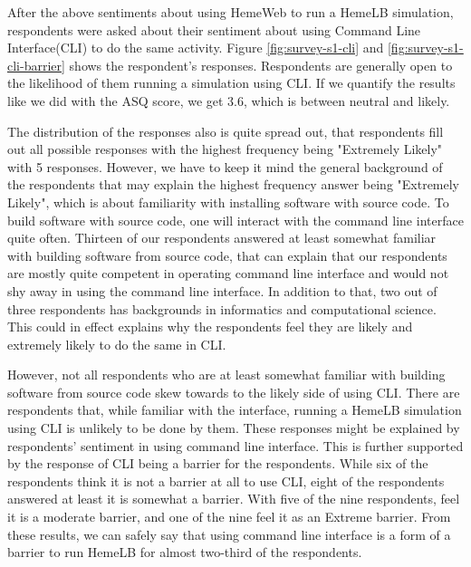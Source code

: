 \vspace{0.5cm}

After the above sentiments about using HemeWeb to run a HemeLB simulation, respondents were asked about their sentiment about using Command Line Interface(CLI) to do the same activity. Figure \ref{fig:survey-s1-cli} and \ref{fig:survey-s1-cli-barrier} shows the respondent's responses. Respondents are generally open to the likelihood of them running a simulation using CLI. If we quantify the results like we did with the ASQ score, we get 3.6, which is between neutral and likely. 

The distribution of the responses also is quite spread out, that respondents fill out all possible responses with   the highest frequency being "Extremely Likely" with 5 responses. However, we have to keep it mind the general background of the respondents that may explain the highest frequency answer being "Extremely Likely", which is about familiarity with installing software with source code. To build software with source code, one will interact with the command line interface quite often. Thirteen of our respondents answered at least somewhat familiar with building software from source code, that can explain that our respondents are mostly quite competent in operating command line interface and would not shy away in using the command line interface. In addition to that, two out of three respondents has backgrounds in informatics and computational science. This could in effect explains why the respondents feel they are likely and extremely likely to do the same in CLI. 

However, not all respondents who are at least somewhat familiar with building software from source code skew towards to the likely side of using CLI. There are respondents that, while familiar with the interface, running a HemeLB simulation using CLI is unlikely to be done by them. These responses might be explained by respondents' sentiment in using command line interface. This is further supported by the response of CLI being a barrier for the respondents. While six of the respondents think it is not a barrier at all to use CLI, eight of the respondents answered at least it is somewhat a barrier. With five of the nine respondents, feel it is a moderate barrier, and one of the nine feel it as an Extreme barrier. From these results, we can safely say that using command line interface is a form of a barrier to run HemeLB for almost two-third of the respondents.





